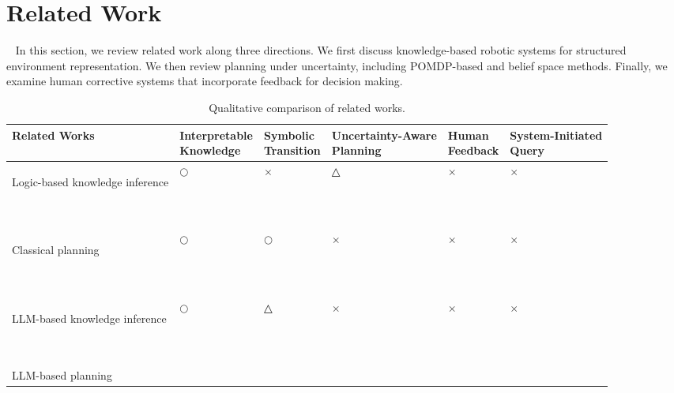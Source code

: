 \section{Related Work}~\label{related}
In this section, we review related work along three directions. We first discuss knowledge-based robotic systems for structured environment representation. We then review planning under uncertainty, including POMDP-based and belief space methods. Finally, we examine human corrective systems that incorporate feedback for decision making.



\begin{table}[t]
\caption{Qualitative comparison of related works.}
\label{tab:comparison}
\centering
\small
\setlength{\tabcolsep}{3pt}
\begin{tabularx}{\textwidth}{p{}
>{\centering\arraybackslash}X
>{\centering\arraybackslash}X
>{\centering\arraybackslash}X
>{\centering\arraybackslash}X
>{\centering\arraybackslash}X}
\toprule
Related Works
& \makecell{Interpretable\\Knowledge}
& \makecell{Symbolic\\Transition}
& \makecell{Uncertainty-Aware\\Planning}
& \makecell{Human\\Feedback}
& \makecell{System-Initiated\\Query} \\
\midrule

Logic-based knowledge inference

~\cite{tenorth2012knowledge,liu2020graph,
kunze2014using,hasegawa2023inferring,
mota2021integrated,zhang2024icorpp,daruna2019robocse,
mitrevsk2021ontology,olivares2019review,manzoor2021ontology}
& $\bigcirc$
& $\times$
& △
& $\times$ 
& $\times$ \\

Classical planning

~\cite{fikes1971strips,aeronautiques1998pddl,
helmert2009concise,hoffmann2001ff,
helmert2006fast,correa2024lifted}
& $\bigcirc$
& $\bigcirc$
& $\times$
& $\times$ 
& $\times$ \\

LLM-based knowledge inference

~\cite{ahn2022can,huang2022inner,singh2023progprompt,liang2023code,ding2023task,gu2024conceptgraphs,leanza2025conceptbot}
& $\bigcirc$
& △
& $\times$
& $\times$
& $\times$ \\

LLM-based planning


\end{tabularx}
\end{table}

